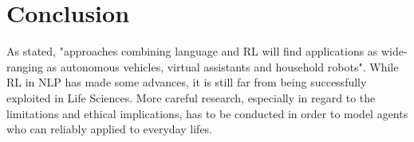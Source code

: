 \documentclass[11pt,a4paper]{article}
\begin{document}
\section{Conclusion}
As  \citet{ijcai2019} stated, "approaches combining language and RL will find applications as wide-ranging as autonomous vehicles, virtual assistants and household robots". While RL in NLP has made some advances, it is still far from being successfully exploited in Life Sciences. More careful research, especially in regard to the limitations and ethical implications, has to be conducted in order to model agents who can reliably applied to everyday lifes. 

\newpage

\end{document}
